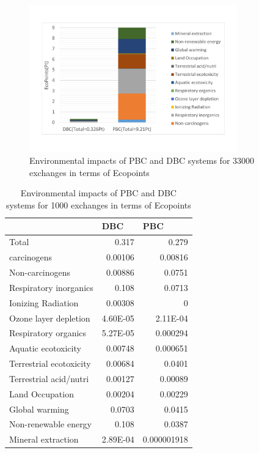 \documentclass[conference]{IEEEtran}
\begin{document}
\begin{figure}[h]
\centering
\includegraphics[width=9cm]{onescore33KMasdar.pdf}
\caption{Environmental impacts of PBC and DBC systems for 33000 exchanges in terms of Ecopoints}
\label{fig:onescoreMasdar}
\end{figure}


\begin{table}[htbp]
\caption{Environmental impacts of PBC and DBC systems for 1000 exchanges in terms of Ecopoints}
\begin{center}
\begin{tabular}{|l|r|r|}
\hline
 & \multicolumn{1}{l|}{DBC} & \multicolumn{1}{l|}{PBC} \\ \hline
Total & 0.317 & 0.279 \\ \hline
carcinogens & 0.00106 & 0.00816 \\ \hline
Non-carcinogens & 0.00886 & 0.0751 \\ \hline
Respiratory inorganics & 0.108 & 0.0713 \\ \hline
Ionizing Radiation & 0.00308 & 0 \\ \hline
Ozone layer depletion & 4.60E-05 & 2.11E-04 \\ \hline
Respiratory organics & 5.27E-05 & 0.000294 \\ \hline
Aquatic ecotoxicity & 0.00748 & 0.000651 \\ \hline
Terrestrial ecotoxicity & 0.00684 & 0.0401 \\ \hline
Terrestrial acid/nutri & 0.00127 & 0.00089 \\ \hline
Land Occupation & 0.00204 & 0.00229 \\ \hline
Global warming & 0.0703 & 0.0415 \\ \hline
Non-renewable energy & 0.108 & 0.0387 \\ \hline
Mineral extraction & 2.89E-04 & 0.000001918 \\ \hline
\end{tabular}
\end{center}
\label{PBCandDBC_2kexchanges}
\end{table}
\end{document}
